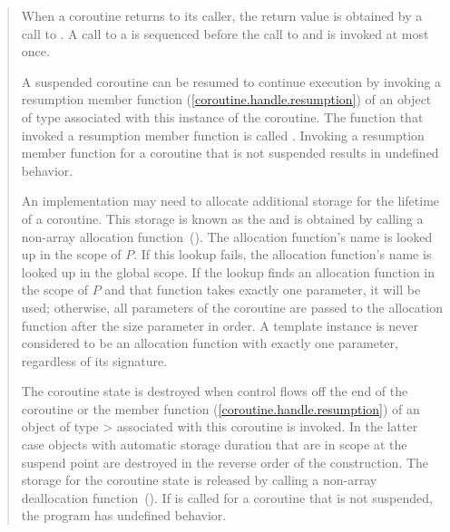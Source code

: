 \begin{quote}
\pnum
When a coroutine returns to its caller, the return value is obtained by a call to . A call to a  is sequenced before the call to  and is invoked at most once.


\pnum
A suspended coroutine can be resumed
to continue execution by invoking
a resumption member function (\ref{coroutine.handle.resumption}) of an object of type  
associated with this instance of the coroutine. The function that invoked a resumption member function is called . Invoking a resumption member function for a coroutine that is not suspended results in undefined behavior. 

\pnum
An implementation may need to allocate additional storage for the 
lifetime of a coroutine. This storage is known as the  and is obtained by calling a non-array allocation function~().
The allocation function's name is looked up in the scope of $P$. If this lookup fails, the allocation function's name is looked up in the global scope. If the lookup finds an allocation function in the scope of $P$ and that function takes exactly one parameter, it will be used; otherwise, all parameters of the coroutine are passed to the allocation function after the size parameter in order.
A template instance is never considered to be an allocation function with exactly one parameter, regardless of its signature. 

\pnum
The coroutine state is destroyed when
control flows off the end of the coroutine or
the  member function (\ref{coroutine.handle.resumption}) of an object of type > associated with this coroutine is invoked. In the latter case objects with automatic storage duration that are in scope
at the suspend point are destroyed in the reverse order of the construction. The storage for the coroutine state is released by calling a non-array deallocation
function~(). If  is called for a coroutine that is not suspended, the program has undefined behavior.


\end{quote}
